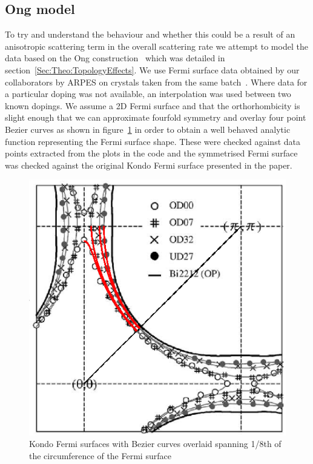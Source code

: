 
\subsection{Ong model}

To try and understand the behaviour and whether this could be a result of an anisotropic scattering term in the overall scattering rate we attempt to model the data based on the Ong construction~\cite{Ong1991} which was detailed in section~\ref{Sec:Theo:TopologyEffects}. We use Fermi surface data obtained by our collaborators by \ac{ARPES} on crystals taken from the same batch~\cite{Kondo2004}. Where data for a particular doping was not available, an interpolation was used between two known dopings. We assume a 2D Fermi surface and that the orthorhombicity is slight enough that we can approximate fourfold symmetry and overlay four point Bezier curves as shown in figure~\ref{Fig:ResH:KondoFS} in order to obtain a well behaved analytic function representing the Fermi surface shape. These were checked against data points extracted from the plots in the code and the symmetrised Fermi surface was checked against the original Kondo Fermi surface presented in the paper.
\begin{figure}[htbp]
    \begin{center}
        \includegraphics[scale=0.9]{Chapter-HallBSCO/Figures/KondoFS/KondoFS}
        \caption{Kondo Fermi surfaces with Bezier curves overlaid spanning 1/8th of the circumference of the Fermi surface}
        \label{Fig:ResH:KondoFS}
    \end{center}
\end{figure}

